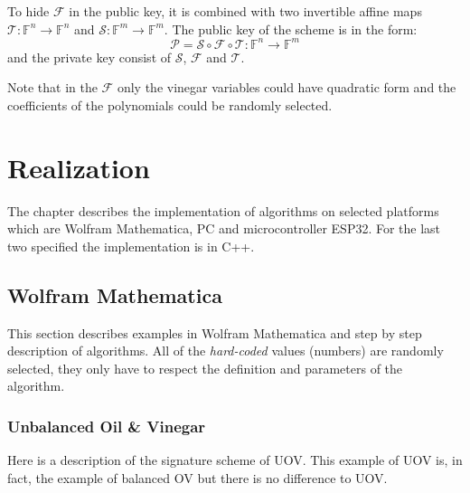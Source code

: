 \documentclass[thesis=M,english]{FITthesis}[2019/12/23]
\begin{document}
\bigskip
\noindent
To hide $\mathcal{F}$ in the public key, it is combined with two invertible affine maps $\mathcal{T}: \mathbb{F}^n \rightarrow \mathbb{F}^n$ and $\mathcal{S}: \mathbb{F}^m \rightarrow \mathbb{F}^m$. The public key of the scheme is in the form:
\[
\mathcal{P} = \mathcal{S} \circ \mathcal{F} \circ \mathcal{T} : \mathbb{F}^n \rightarrow \mathbb{F}^m
\]
and the private key consist of $\mathcal{S}$, $\mathcal{F}$ and $\mathcal{T}$.

\bigskip
\noindent
Note that in the $\mathcal{F}$ only the vinegar variables could have quadratic form and the coefficients of the polynomials could be randomly selected.

\chapter{Realization}
The chapter describes the implementation of algorithms on selected platforms which are Wolfram Mathematica, PC and microcontroller ESP32. For the last two specified the implementation is in C++.

\section{Wolfram Mathematica}
This section describes examples in Wolfram Mathematica and step by step description of algorithms. All of the \textit{hard-coded} values (numbers) are randomly selected, they only have to respect the definition and parameters of the algorithm.

\subsection{Unbalanced Oil \& Vinegar}
Here is a description of the signature scheme of UOV. This example of UOV is, in fact, the example of balanced OV but there is no difference to UOV.
\end{document}
